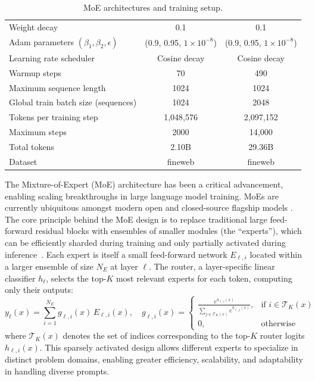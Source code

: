\documentclass[11pt, a4paper]{include/gdm_format}
\begin{document}
{\begin{table}[h]
\begin{tabular}{lcc}
Weight decay & 0.1 & 0.1 \\
Adam parameters $(\beta_1,\beta_2,\epsilon)$ & (0.9, 0.95, $1\!\times\!10^{-8}$) & (0.9, 0.95, $1\!\times\!10^{-8}$) \\
Learning rate scheduler & Cosine decay & Cosine decay \\
Warmup steps & 70 & 490 \\
\midrule
Maximum sequence length & 1024 & 1024 \\
Global train batch size (sequences) & 1024 & 2048 \\
Tokens per training step & 1{,}048{,}576 & 2{,}097{,}152 \\
Maximum steps & 2000 & 14{,}000 \\
Total tokens & 2.10B & 29.36B \\
Dataset & fineweb & fineweb \\
\bottomrule
\end{tabular}
\caption{MoE architectures and training setup.}
\label{tab:moe_hparams}
\end{table}

The Mixture-of-Expert (MoE) architecture \citep{moe_sem_1, moe_sem_2, moe_mod_1_2exp, moe_mod_2_switch_1exp} has been a critical advancement, enabling scaling breakthroughs in large language model training. MoEs are currently ubiquitous amongst modern open and closed-source flagship models \citep{moe_gemini15, guo2025deepseek, llama4, moe_qwen3, moe_gemini25}. The core principle behind the MoE design is to replace traditional large feed-forward residual blocks with ensembles of smaller modules (the ``experts''), which can be efficiently sharded during training and only partially activated during inference~\citep{moe_mod_2_switch_1exp}. Each expert is itself a small feed-forward network $E_{\ell,i}$ located within a larger ensemble of size $N_E$ at layer $\ell$. The router, a layer-specific linear classifier $h_\ell$, selects the top-$K$ most relevant experts for each token, computing only their outputs:
\begin{equation}
\label{eq:moe_layer_extended}
y_\ell(x) = \sum^{N_E}_{i=1} g_{\ell,i}(x)\, E_{\ell,i}(x), \quad
g_{\ell,i}(x) =
\begin{cases}
\frac{e^{h_{\ell,i}(x)}}{\sum_{j \in \mathcal{T}_K(x)} e^{h_{\ell,j}(x)}}, & \text{if } i \in \mathcal{T}_K(x) \\
0, & \text{otherwise}
\end{cases}
\end{equation}
where $\mathcal{T}_K(x)$ denotes the set of indices corresponding to the top-$K$ router logits $h_{\ell,i}(x)$. This sparsely activated design allows different experts to specialize in distinct problem domains, enabling greater efficiency, scalability, and adaptability in handling diverse prompts.

}
\end{document}
